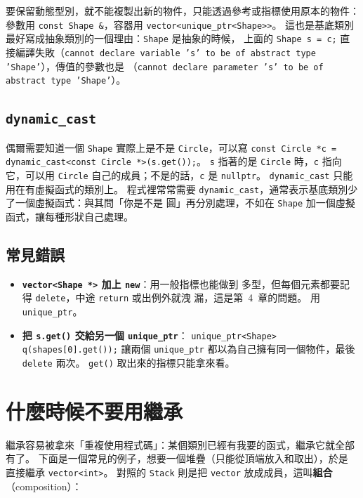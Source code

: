 要保留動態型別，就不能複製出新的物件，只能透過參考或指標使用原本的物件：
參數用 \texttt{const Shape \&}，容器用 \texttt{vector<unique\_ptr<Shape>>}。
這也是基底類別最好寫成抽象類別的一個理由：\texttt{Shape} 是抽象的時候，
上面的 \texttt{Shape s = c;} 直接編譯失敗（\texttt{cannot declare variable
's' to be of abstract type 'Shape'}），傳值的參數也是
（\texttt{cannot declare parameter 's' to be of abstract type 'Shape'}）。

\subsection{\texttt{dynamic\_cast}}

偶爾需要知道一個 \texttt{Shape} 實際上是不是 \texttt{Circle}，可以寫
\texttt{const Circle *c = dynamic\_cast<const Circle *>(s.get());}。
\texttt{s} 指著的是 \texttt{Circle} 時，\texttt{c} 指向它，可以用
\texttt{Circle} 自己的成員；不是的話，\texttt{c} 是 \texttt{nullptr}。
\texttt{dynamic\_cast} 只能用在有虛擬函式的類別上。 程式裡常常需要
\texttt{dynamic\_cast}，通常表示基底類別少了一個虛擬函式：與其問「你是不是
圓」再分別處理，不如在 \texttt{Shape} 加一個虛擬函式，讓每種形狀自己處理。

\subsection{常見錯誤}

\begin{itemize}
\item \textbf{\texttt{vector<Shape *>} 加上 \texttt{new}}：用一般指標也能做到
多型，但每個元素都要記得 \texttt{delete}，中途 \texttt{return} 或出例外就洩
漏，這是第~4~章的問題。 用 \texttt{unique\_ptr}。
\item \textbf{把 \texttt{s.get()} 交給另一個 \texttt{unique\_ptr}}：
\texttt{unique\_ptr<Shape> q(shapes[0].get());} 讓兩個
\texttt{unique\_ptr} 都以為自己擁有同一個物件，最後 \texttt{delete} 兩次。
\texttt{get()} 取出來的指標只能拿來看。
\end{itemize}

\section{什麼時候不要用繼承}
\label{sec:composition}

繼承容易被拿來「重複使用程式碼」：某個類別已經有我要的函式，繼承它就全部
有了。 下面是一個常見的例子，想要一個堆疊（只能從頂端放入和取出），於是
直接繼承 \texttt{vector<int>}。 對照的 \texttt{Stack} 則是把
\texttt{vector} 放成成員，這叫\textbf{組合}（composition）：

